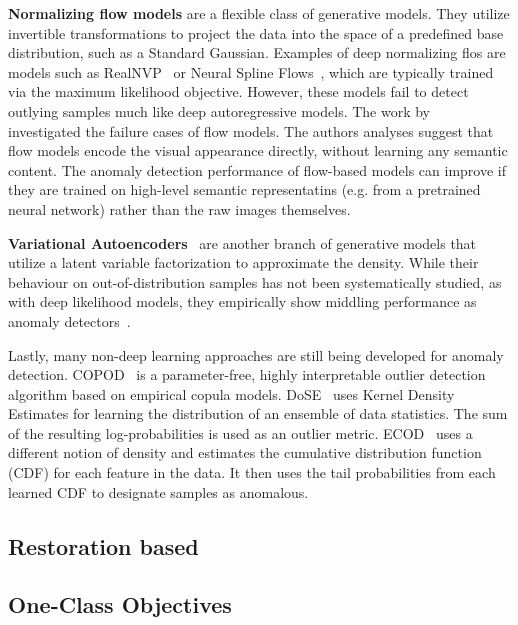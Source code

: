 \textbf{Normalizing flow models} are a flexible class of generative models. They utilize invertible transformations to project the data into the space of a predefined base distribution, such as a Standard Gaussian. Examples of deep normalizing flos are models such as RealNVP~\cite{dinh2017density} or Neural Spline Flows~\cite{NEURIPS2019_7ac71d43}, which are typically trained via the maximum likelihood objective. However, these models fail to detect outlying samples much like deep autoregressive models. The work by ~\cite{normflow_fails} investigated the failure cases of flow models. The authors analyses suggest that flow models encode the visual appearance directly, without learning any semantic content. The anomaly detection performance of flow-based models can improve if they are trained on high-level semantic representatins (e.g. from a pretrained neural network) rather than the raw images themselves. 


\textbf{Variational Autoencoders}~\cite{kingma2013auto} are another branch of generative models that utilize a latent variable factorization to approximate the density. While their behaviour on out-of-distribution samples has not been systematically studied, as with deep likelihood models, they empirically show middling performance as anomaly detectors~\cite{baur2021,kascenasRoleNoiseDenoising2023}.

Lastly, many non-deep learning approaches are still being developed for anomaly detection. COPOD~\cite{copod} is a parameter-free, highly interpretable outlier detection algorithm based on empirical copula models. DoSE~\cite{pmlr-dose} uses Kernel Density Estimates for learning the distribution of an ensemble of data statistics. The sum of the resulting log-probabilities is used as an outlier metric. ECOD~\cite{li_ecod_2022} uses a different notion of density and estimates the cumulative distribution function (CDF) for each feature in the data. It then uses the tail probabilities from each learned CDF to designate samples as anomalous.

\subsection{Restoration based} 
\cite{grahamDenoisingDiffusionModels2023,wyattAnoddpmAnomalyDetection2022}


\subsection{One-Class Objectives}

